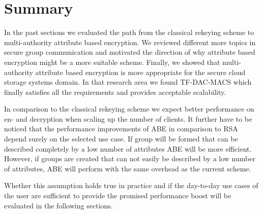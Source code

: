\section{Summary}
In the past sections we evaluated the path from the classical rekeying scheme to multi-authority attribute based encryption. We reviewed different more topics in secure group communication and motivated the direction of why attribute based encryption might be a more suitable scheme. Finally, we showed that multi-authority attribute based encryption is more appropriate for the secure cloud storage systems domain. In that research area we found TF-DAC-MACS which finally satisfies all the requirements and provides acceptable scalability. 

In comparison to the classical rekeying scheme we expect better performance on en- and decryption when scaling up the number of clients. It further have to be noticed that the performance improvements of ABE in comparison to RSA depend surely on the selected use case. If group will be formed that can be described completely by a low number of attributes ABE will be more efficient. However, if groups are created that can not easily be described by a low number of attributes, ABE will perform with the same overhead as the current scheme. 

Whether this assumption holds true in practice and if the day-to-day use cases of the user are sufficient to provide the promised performance boost will be evaluated in the following sections.